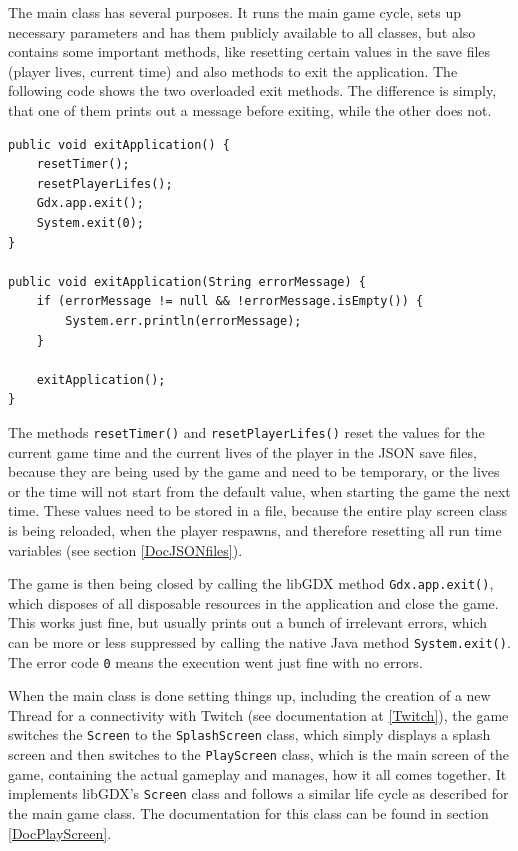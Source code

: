 \documentclass[12p]{article}
\begin{document}
The main class has several purposes. It runs the main game cycle, sets up necessary parameters and has them publicly available to all classes, but also contains some important methods, like resetting certain values in the save files (player lives, current time) and also methods to exit the application. The following code shows the two overloaded exit methods. The difference is simply, that one of them prints out a message before exiting, while the other does not.

\begin{verbatim}
public void exitApplication() {
	resetTimer();
	resetPlayerLifes();
	Gdx.app.exit();
	System.exit(0);
}

public void exitApplication(String errorMessage) {
	if (errorMessage != null && !errorMessage.isEmpty()) {
		System.err.println(errorMessage);
	}

	exitApplication();
}
\end{verbatim}

The methods \texttt{resetTimer()} and \texttt{resetPlayerLifes()} reset the values for the current game time and the current lives of the player in the JSON save files, because they are being used by the game and need to be temporary, or the lives or the time will not start from the default value, when starting the game the next time. These values need to be stored in a file, because the entire play screen class is being reloaded, when the player respawns, and therefore resetting all run time variables (see section \ref{DocJSONfiles}).

The game is then being closed by calling the libGDX method \texttt{Gdx.app.exit()}, which disposes of all disposable resources in the application and close the game. This works just fine, but usually prints out a bunch of irrelevant errors, which can be more or less suppressed by calling the native Java method \texttt{System.exit()}. The error code \texttt{0} means the execution went just fine with no errors.

When the main class is done setting things up, including the creation of a new Thread for a connectivity with Twitch (see documentation at \ref{Twitch}), the game switches the \texttt{Screen} to the \texttt{SplashScreen} class, which simply displays a splash screen and then switches to the \texttt{PlayScreen} class, which is the main screen of the game, containing the actual gameplay and manages, how it all comes together. It implements libGDX's \texttt{Screen} class and follows a similar life cycle as described for the main game class. The documentation for this class can be found in section \ref{DocPlayScreen}.
\end{document}

